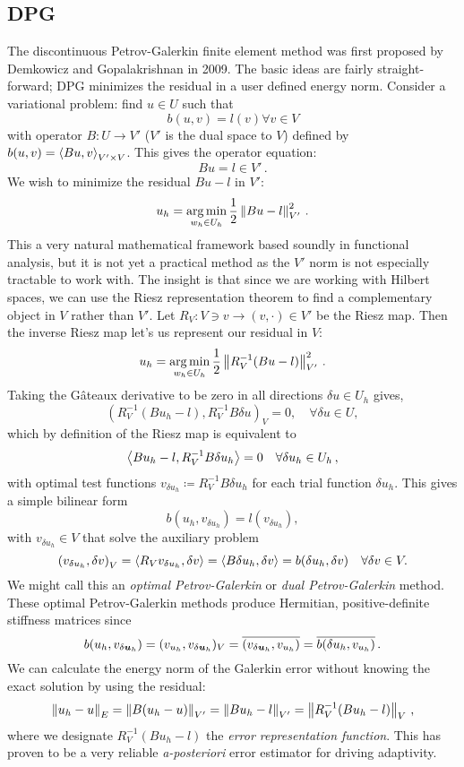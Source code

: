 \documentclass[Proposal.tex]{subfiles}
\begin{document}
\subsection{DPG}
The discontinuous Petrov-Galerkin finite element method was first proposed by Demkowicz and Gopalakrishnan in 2009\cite{DPG1, DPG2}.
The basic ideas are fairly straight-forward; DPG minimizes the residual in a user defined energy norm.
Consider a variational problem: find $u\in U$ such that
\[
b(u,v)=l(v) \forall v\in V
\]
with operator $B:U\rightarrow V'$ ($V'$ is the dual space to $V$) defined by $b(u,v)=\left\langle Bu,v \right\rangle_{V'\times V}$.
This gives the operator equation:
\[
Bu=l\in V'\,.
\]
We wish to minimize the residual $Bu-l$ in $V'$:
\[
u_h=\operatorname*{arg\,min}_{w_h\in U_h}\frac{1}{2}\left\| Bu-l \right\|^2_{V'}\,.
\]
This a very natural mathematical framework based soundly in functional analysis, but it is not yet a practical method as the $V'$ norm is not
especially tractable to work with.
The insight is that since we are working with Hilbert spaces, we can use the Riesz representation theorem to find a complementary object 
in $V$ rather than $V'$. Let $R_V:V\ni v\rightarrow(v,\cdot)\in V'$ be the Riesz map. 
Then the inverse Riesz map let's us represent our residual in $V$:
\[
u_h=\operatorname*{arg\,min}_{w_h\in U_h}\frac{1}{2}\left\| R_V^{-1}(Bu-l) \right\|^2_{V'}\,.
\]
Taking the G\^ateaux derivative to be zero in all directions $\delta u \in
U_h$ gives,
\[
\left(R_V^{-1}(Bu_h-l),R_V^{-1}B\delta u\right)_V = 0, \quad \forall \delta u \in U,
\]
which by definition of the Riesz map is equivalent to 
\begin{equation*}
\left\langle Bu_h-l,R_V^{-1}B\delta u_h \right\rangle=0\quad\forall\delta u_h\in U_h\,,
\end{equation*}
with optimal test functions $v_{\delta u_h}\coloneqq R_V^{-1}B\delta u_h$ for each trial function $\delta u_h$.
This gives a simple bilinear form
\begin{equation*}
b(u_h,v_{\delta u_h})=l(v_{\delta u_h}),
\end{equation*}
with $v_{\delta u_h}\in V$ that solve the auxiliary problem
\begin{equation*}
\left( v_{\delta u_h},\delta v \right)_V=\left\langle R_Vv_{\delta u_h},\delta v \right\rangle
=\left\langle B\delta u_h,\delta v \right\rangle=b(\delta u_h,\delta v)\quad\forall\delta v\in V.
\end{equation*}
We might call this an \emph{optimal Petrov-Galerkin} or \emph{dual Petrov-Galerkin} method.
These optimal Petrov-Galerkin methods produce Hermitian, positive-definite stiffness matrices since
\[
b(u_h,v_{\delta\boldsymbol{u}_h})=(v_{u_h},v_{\delta\boldsymbol{u}_h})_V=\overline{(v_{\delta\boldsymbol{u}_h},v_{u_h})}=\overline{b(\delta u_h,v_{u_h})}\,.
\]
We can calculate the energy norm of the Galerkin error without knowing the exact solution by using the residual:
\[
\left\| u_h-u \right\|_E=\left\| B(u_h-u) \right\|_{V'}=\left\| Bu_h-l \right\|_{V'}=\left\| R_V^{-1}(Bu_h-l) \right\|_V\,,
\]
where we designate $R_V^{-1}(Bu_h-l)$ the \emph{error representation function}.
This has proven to be a very reliable \emph{a-posteriori} error estimator for driving adaptivity.
\end{document}
